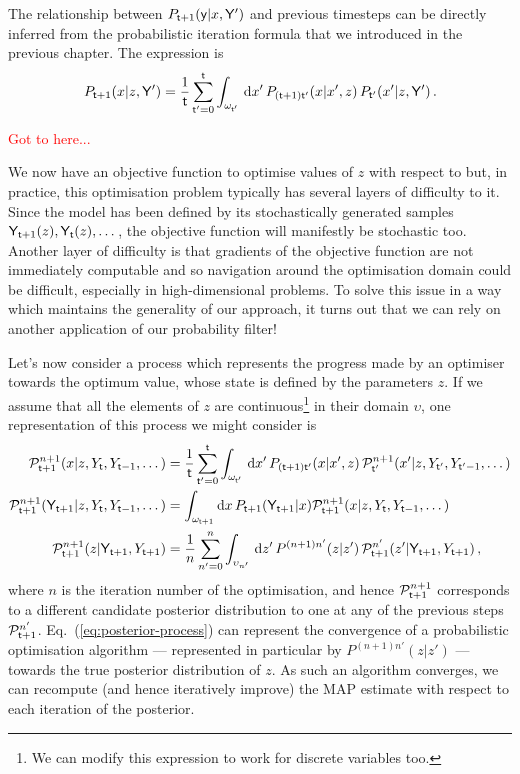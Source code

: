 The relationship between $P_{{\sf t}+1}({\sf y}\vert x, {\sf Y}')$ and previous timesteps can be directly inferred from the probabilistic iteration formula that we introduced in the previous chapter. The expression is
\begin{align} 
P_{{\sf t}+1}(x\vert z, {\sf Y}') = \frac{1}{{\sf t}}\sum_{{\sf t}'=0}^{{\sf t}}\int_{\omega_{{\sf t}'}} \,{\rm d}x' \, P_{({\sf t}+1){\sf t}'}(x\vert x',z)\, P_{{\sf t}'}(x'\vert z, {\sf Y}') \,.
\end{align}

\textcolor{red}{Got to here...}

We now have an objective function to optimise values of $z$ with respect to but, in practice, this optimisation problem typically has several layers of difficulty to it. Since the model has been defined by its stochastically generated samples ${\sf Y}_{{\sf t}+1}(z), {\sf Y}_{{\sf t}}(z), \dots$, the objective function will manifestly be stochastic too. Another layer of difficulty is that gradients of the objective function are not immediately computable and so navigation around the optimisation domain could be difficult, especially in high-dimensional problems. To solve this issue in a way which maintains the generality of our approach, it turns out that we can rely on another application of our probability filter!

Let's now consider a process which represents the progress made by an optimiser towards the optimum value, whose state is defined by the parameters $z$. If we assume that all the elements of $z$ are continuous\footnote{We can modify this expression to work for discrete variables too.} in their domain $\upsilon$, one representation of this process we might consider is
\begin{align} 
{\cal P}^{n+1}_{{\sf t}+1}(x\vert z, Y_{{\sf t}}, Y_{{\sf t}-1}, \dots) &= \frac{1}{{\sf t}}\sum_{{\sf t}'=0}^{{\sf t}}\int_{\omega_{{\sf t}'}} \,{\rm d}x' \, P_{({\sf t}+1){\sf t}'}(x\vert x',z)\, {\cal P}^{n+1}_{{\sf t}'}(x'\vert z, Y_{{\sf t}'}, Y_{{\sf t}'-1}, \dots) \\
{\cal P}^{n+1}_{{\sf t}+1}({\sf Y}_{{\sf t}+1} \vert z, Y_{{\sf t}}, Y_{{\sf t}-1}, \dots) &= \int_{\omega_{{\sf t}+1}}{\rm d}x\, P_{{\sf t}+1}({\sf Y}_{{\sf t}+1} \vert x){\cal P}^{n+1}_{{\sf t}+1}(x\vert z, Y_{{\sf t}}, Y_{{\sf t}-1}, \dots) \\
{\cal P}^{n+1}_{{\sf t}+1}(z \vert {\sf Y}_{{\sf t}+1}, Y_{{\sf t}+1}) &= \frac{1}{n}\sum_{n'=0}^n\int_{\upsilon_{n'}} \,{\rm d}z' \, P^{(n+1)n'}(z\vert z')\, {\cal P}^{n'}_{{\sf t}+1}(z'\vert {\sf Y}_{{\sf t}+1}, Y_{{\sf t}+1}) \label{eq:posterior-process} \,,
\end{align}
where $n$ is the iteration number of the optimisation, and hence ${\cal P}^{n+1}_{{\sf t}+1}$ corresponds to a different candidate posterior distribution to one at any of the previous steps ${\cal P}^{n'}_{{\sf t}+1}$. Eq.~(\ref{eq:posterior-process}) can represent the convergence of a probabilistic optimisation algorithm --- represented in particular by $P^{(n+1)n'}(z\vert z')$ --- towards the true posterior distribution of $z$. As such an algorithm converges, we can recompute (and hence iteratively improve) the MAP estimate with respect to each iteration of the posterior.

